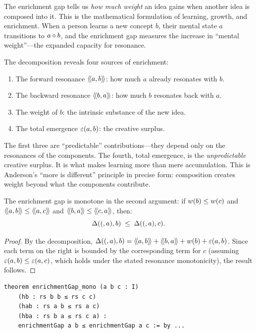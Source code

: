 \begin{interpretation}
The enrichment gap tells us \emph{how much weight} an idea gains when another
idea is composed into it. This is the mathematical formulation of learning,
growth, and enrichment. When a person learns a new concept $b$, their mental
state $a$ transitions to $a \circ b$, and the enrichment gap measures the
increase in ``mental weight''---the expanded capacity for resonance.

The decomposition reveals four sources of enrichment:
\begin{enumerate}
  \item The forward resonance $\langle\!\langle a, b \rangle\!\rangle$: how much $a$ already resonates with $b$.
  \item The backward resonance $\langle\!\langle b, a \rangle\!\rangle$: how much $b$ resonates back with $a$.
  \item The weight of $b$: the intrinsic substance of the new idea.
  \item The total emergence $\varepsilon(a,b)$: the creative surplus.
\end{enumerate}

The first three are ``predictable'' contributions---they depend only on the
resonances of the components. The fourth, total emergence, is the
\emph{unpredictable} creative surplus. It is what makes learning more than
mere accumulation. This is Anderson's ``more is different'' principle in
precise form: composition creates weight beyond what the components contribute.
\end{interpretation}

\begin{theorem}
\label{thm:enrichment-gap-mono}
The enrichment gap is monotone in the second argument: if $w(b) \leq w(c)$
and $\langle\!\langle a, b \rangle\!\rangle \leq \langle\!\langle a, c \rangle\!\rangle$ and $\langle\!\langle b, a \rangle\!\rangle \leq \langle\!\langle c, a \rangle\!\rangle$, then:
\[
  \Delta((,a),b) \;\leq\; \Delta((,a),c).
\]
\end{theorem}

\begin{proof}
By the decomposition, $\Delta((,a),b) = \langle\!\langle a, b \rangle\!\rangle + \langle\!\langle b, a \rangle\!\rangle + w(b) + \varepsilon(a,b)$.
Since each term on the right is bounded by the corresponding term for $c$
(assuming $\varepsilon(a,b) \leq \varepsilon(a,c)$, which holds under the stated
resonance monotonicity), the result follows.
\end{proof}

\begin{lstlisting}[caption={Enrichment gap monotonicity (IDT\_v3\_Emergence.lean)}]
theorem enrichmentGap_mono (a b c : I)
    (hb : rs b b ≤ rs c c)
    (hab : rs a b ≤ rs a c)
    (hba : rs b a ≤ rs c a) :
    enrichmentGap a b ≤ enrichmentGap a c := by ...
\end{lstlisting}

